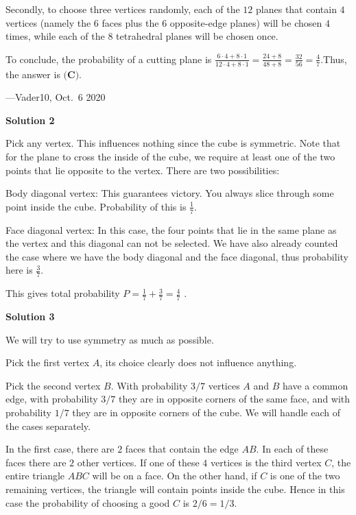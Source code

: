 \begin{enumerate}
 Secondly, to choose three vertices randomly, each of the $12$ planes that contain $4$ vertices (namely the $6$ faces plus the $6$ opposite-edge planes) will be chosen $4$ times, while each of the $8$ tetrahedral planes will be chosen once.

 To conclude, the probability of a cutting plane is $\frac{6\cdot 4 + 8\cdot 1}{12\cdot 4 + 8\cdot 1}  = \frac{24 + 8}{48 + 8}  = \frac{32}{56}  = \frac{4}{7}.$Thus, the answer is $\boxed{\textbf{(C)}}$.

 ---Vader10, Oct.~6 2020

 



\textbf{Solution 2}

Pick any vertex. This influences nothing since the cube is symmetric. Note that for the plane to cross the inside of the cube, we require at least one of the two points that lie opposite to the vertex. There are two possibilities: 

 Body diagonal vertex: This guarantees victory. You always slice through some point inside the cube. Probability of this is $\frac{1}{7}$.

 Face diagonal vertex: In this case, the four points that lie in the same plane as the vertex and this diagonal can not be selected. We have also already counted the case where we have the body diagonal and the face diagonal, thus probability here is $\frac{3}{7}$.

 This gives total probability $\boxed{P = \frac{1}{7} + \frac{3}{7} = \frac{4}{7}}$ .

 



\textbf{Solution 3}

We will try to use symmetry as much as possible.

 Pick the first vertex $A$, its choice clearly does not influence anything.

 Pick the second vertex $B$. With probability $3/7$ vertices $A$ and $B$ have a common edge, with probability $3/7$ they are in opposite corners of the same face, and with probability $1/7$ they are in opposite corners of the cube. We will handle each of the cases separately.

 In the first case, there are $2$ faces that contain the edge $AB$. In each of these faces there are $2$ other vertices. If one of these $4$ vertices is the third vertex $C$, the entire triangle $ABC$ will be on a face. On the other hand, if $C$ is one of the two remaining vertices, the triangle will contain points inside the cube. Hence in this case the probability of choosing a good $C$ is $2/6 = 1/3$.


\end{enumerate}
